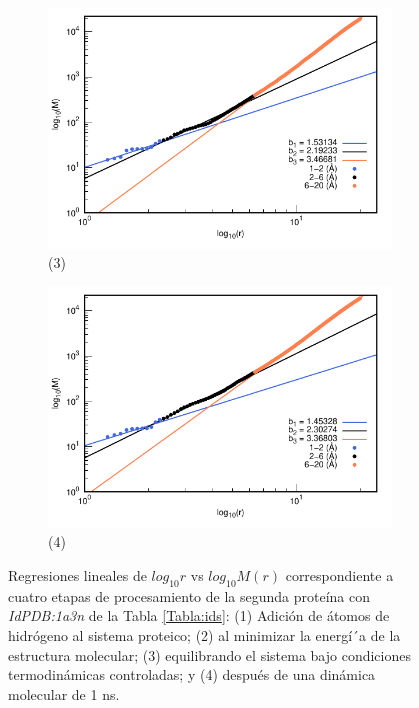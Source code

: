 \begin{figure}[H]
			\vspace{0cm} %
			
			\hspace{-0.3cm} 
			\begin{subfigure}{0.49\textwidth}
				\centering
				\includegraphics[width=\linewidth,page=1]{graphs/PDBs/1a3n/1a3nEq.pdf}
				\caption{(3)}
			\end{subfigure}
			\hspace{0.2cm}
			\begin{subfigure}{0.49\textwidth} %
				\centering
				\includegraphics[width=\linewidth,page=1]{graphs/PDBs/1a3n/1a3n1ns.pdf}
				\caption{(4)}
			\end{subfigure}
			\caption{Regresiones lineales de $log_{10}r$ vs $log_{10}M(r)$ correspondiente a cuatro etapas de procesamiento de la segunda prote\'{i}na con \textit{IdPDB:1a3n} de la Tabla \ref{Tabla:ids}: (1) Adici\'{o}n de \'{a}tomos de hidr\'{o}geno al sistema proteico; (2) al minimizar la energ\'{i´}a de la estructura molecular; (3) equilibrando el sistema bajo condiciones termodin\'{a}micas controladas; y (4) despu\'{e}s de una din\'{a}mica molecular de 1 ns.}
			\label{fig:1a3n}
		\end{figure}
		
